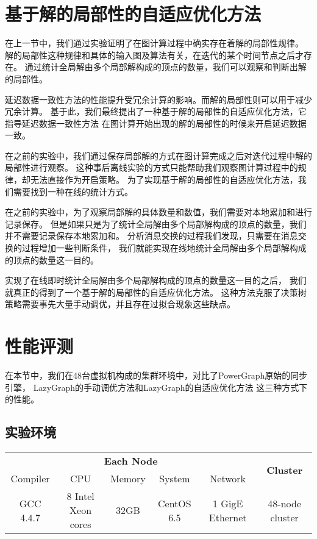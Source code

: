 
\section{基于解的局部性的自适应优化方法}
在上一节中，我们通过实验证明了在图计算过程中确实存在着解的局部性规律。
解的局部性这种规律和具体的输入图及算法有关，在迭代的某个时间节点之后才存在。
通过统计全局解由多个局部解构成的顶点的数量，我们可以观察和判断出解的局部性。


延迟数据一致性方法的性能提升受冗余计算的影响。而解的局部性则可以用于减少冗余计算。
基于此，我们最终提出了一种基于解的局部性的自适应优化方法，它指导延迟数据一致性方法
在图计算开始出现的解的局部性的时候来开启延迟数据一致。

在之前的实验中，我们通过保存局部解的方式在图计算完成之后对迭代过程中解的局部性进行观察。
这种事后离线实验的方式只能帮助我们观察图计算过程中的规律，却无法直接作为开启策略。
为了实现基于解的局部性的自适应优化方法，我们需要找到一种在线的统计方式。

在之前的实验中，为了观察局部解的具体数量和数值，我们需要对本地累加和进行记录保存。
但是如果只是为了统计全局解由多个局部解构成的顶点的数量，我们并不需要记录保存本地累加和。
分析消息交换的过程我们发现，只需要在消息交换的过程增加一些判断条件，
我们就能实现在线地统计全局解由多个局部解构成的顶点的数量这一目的。

实现了在线即时统计全局解由多个局部解构成的顶点的数量这一目的之后，
我们就真正的得到了一个基于解的局部性的自适应优化方法。
这种方法克服了决策树策略需要事先大量手动调优，并且存在过拟合现象这些缺点。

\section{性能评测}

在本节中，我们在48台虚拟机构成的集群环境中，对比了PowerGraph原始的同步引擎，
LazyGraph的手动调优方法和LazyGraph的自适应优化方法
这三种方式下的性能。

\subsection{实验环境}
\begin{table}[htb]
  \centering
  \label{tab:experimental_methodology}
    \begin{tabular}{cccccc}
     \toprule[1.5pt]
     \multicolumn{5}{c}{\textbf{Each Node}} &   \multirow{2}{*}{\textbf{Cluster}} \\
     \cmidrule(lr){1-5}
     Compiler & CPU & Memory & System & Network \\
     \midrule[1pt]
     GCC 4.4.7 & 8 Intel Xeon cores & 32GB & CentOS 6.5  & 1 GigE Ethernet & 48-node cluster\\
     \bottomrule[1.5pt]
    \end{tabular}
\end{table}



